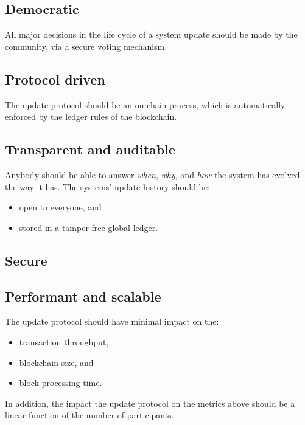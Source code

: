 \documentclass[11pt,a4paper]{article}
\begin{document}
\subsection{Democratic}
\label{sec:decentr-decis-making}

All major decisions in the life cycle of a system update should be made by the
community, via a secure voting mechanism.

\subsection{Protocol driven}
\label{sec:protocol-driven}

The update protocol should be an on-chain process, which is automatically
enforced by the ledger rules of the blockchain.

\subsection{Transparent and auditable}
\label{sec:transp-audit}

Anybody should be able to answer \emph{when}, \emph{why}, and \emph{how} the
system has evolved the way it has. The systems' update history should be:
\begin{itemize}
\item open to everyone, and
\item stored in a tamper-free global ledger.
\end{itemize}

\subsection{Secure}
\label{sec:secure}


\subsection{Performant and scalable}
\label{sec:performant-scalable}

The update protocol should have minimal impact on the:
\begin{itemize}
\item transaction throughput,
\item blockchain size, and
\item block processing time.
\end{itemize}
In addition, the impact the update protocol on the metrics above should be a
linear function of the number of participants.
\end{document}
